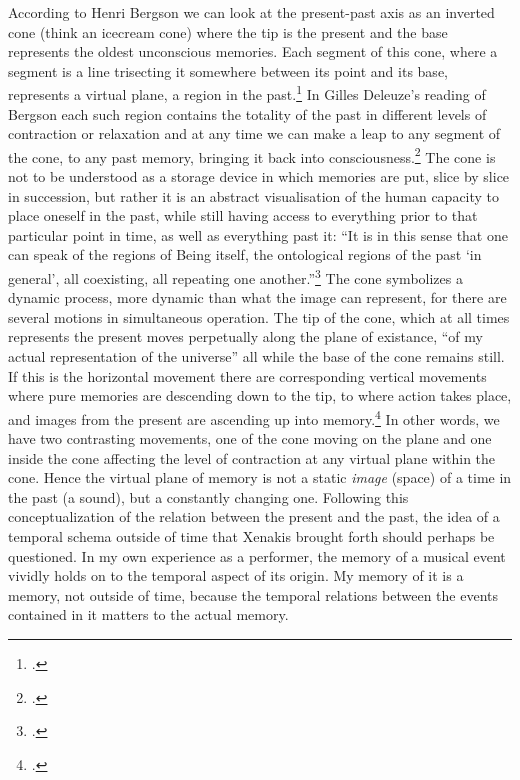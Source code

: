 According to Henri Bergson we can look at the present-past axis as an inverted cone (think an icecream cone) where the tip is the present and the base represents the oldest unconscious memories. Each segment of this cone, where a segment is a line trisecting it somewhere between its point and its base, represents a virtual plane, a region in the past.\footcite[][Ch.3]{bergson91} 
In Gilles Deleuze's reading of Bergson each such region contains the totality of the past in different levels of contraction or relaxation and at any time we can make a leap to any segment of the cone, to any past memory, bringing it back into consciousness.\footcite[][60]{deleuze88} The cone is not to be understood as a storage device in which memories are put, slice by slice in succession, but rather it is an abstract visualisation of the human capacity to place oneself in the past, while still having access to everything prior to that particular point in time, as well as everything past it: ``It is in this sense that one can speak of the regions of Being itself, the ontological regions of the past `in general', all coexisting, all repeating one another.''\footcite[61]{deleuze88}
The cone symbolizes a dynamic process, more dynamic than what the image can represent, for there are several motions in simultaneous operation. The tip of the cone, which at all times represents the present moves perpetually along the plane of existance, ``of my actual representation of the universe'' all while the base of the cone remains still. If this is the horizontal movement there are corresponding vertical movements where pure memories are descending down to the tip, to where action takes place, and images from the present are ascending up into memory.\footcite[See also][47-8]{lawlor03} In other words, we have two contrasting movements, one of the cone moving on the plane and one inside the cone affecting the level of contraction at any virtual plane within the cone. Hence the virtual plane of memory is not a static \emph{image} (space) of a time in the past (a sound), but a constantly changing one. Following this conceptualization of the relation between the present and the past, the idea of a temporal schema outside of time that Xenakis brought forth should perhaps be questioned. In my own experience as a performer, the memory of a musical event vividly holds on to the temporal aspect of its origin. My memory of it is a memory, not outside of time, because the temporal relations between the events contained in it matters to the actual memory.

